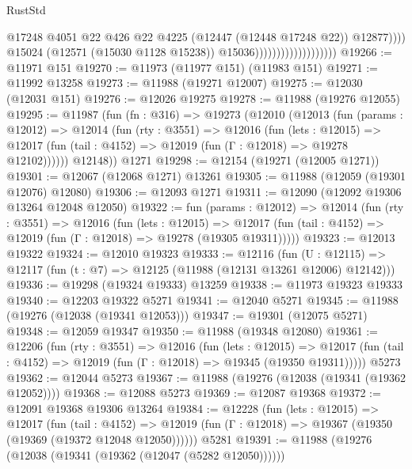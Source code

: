 \begin{lexlean}{RustStd}
\begin{coremodule}
                                                  @17248
                                                  @4051
                                                  @22
                                                  @426
                                                  @22
                                                  @4225
                                                  (@12447 (@12448 @17248 @22))
                                                  @12877))))
                                          @15024
                                          (@12571 (@15030 @1128 @15238))
                                          @15036)))))))))))))))))))
@19266 := @11971 @151
@19270 := @11973 (@11977 @151) (@11983 @151)
@19271 := @11992 @13258
@19273 := @11988 (@19271 @12007)
@19275 := @12030 (@12031 @151)
@19276 := @12026 @19275
@19278 := @11988 (@19276 @12055)
@19295 := @11987
    (fun (fn : @316) =>
    @19273
      (@12010
        (@12013
          (fun (params : @12012) =>
          @12014
            (fun (rty : @3551) =>
            @12016
              (fun (lets : @12015) =>
              @12017 (fun (tail : @4152) => @12019 (fun (Γ : @12018) => @19278 @12102))))))
        @12148))
    @1271
@19298 := @12154 (@19271 (@12005 @1271))
@19301 := @12067 (@12068 @1271) @13261
@19305 := @11988 (@12059 (@19301 @12076) @12080)
@19306 := @12093 @1271
@19311 := @12090 (@12092 @19306 @13264 @12048 @12050)
@19322 := fun (params : @12012) =>
  @12014
    (fun (rty : @3551) =>
    @12016
      (fun (lets : @12015) =>
      @12017 (fun (tail : @4152) => @12019 (fun (Γ : @12018) => @19278 (@19305 @19311)))))
@19323 := @12013 @19322
@19324 := @12010 @19323
@19333 := @12116
    (fun (U : @12115) => @12117 (fun (t : @7) => @12125 (@11988 (@12131 @13261 @12006) @12142)))
@19336 := @19298 (@19324 @19333) @13259
@19338 := @11973 @19323 @19333
@19340 := @12203 @19322 @5271
@19341 := @12040 @5271
@19345 := @11988 (@19276 (@12038 (@19341 @12053)))
@19347 := @19301 (@12075 @5271)
@19348 := @12059 @19347
@19350 := @11988 (@19348 @12080)
@19361 := @12206
    (fun (rty : @3551) =>
    @12016
      (fun (lets : @12015) =>
      @12017 (fun (tail : @4152) => @12019 (fun (Γ : @12018) => @19345 (@19350 @19311)))))
    @5273
@19362 := @12044 @5273
@19367 := @11988 (@19276 (@12038 (@19341 (@19362 @12052))))
@19368 := @12088 @5273
@19369 := @12087 @19368
@19372 := @12091 @19368 @19306 @13264
@19384 := @12228
    (fun (lets : @12015) =>
    @12017
      (fun (tail : @4152) =>
      @12019 (fun (Γ : @12018) => @19367 (@19350 (@19369 (@19372 @12048 @12050))))))
    @5281
@19391 := @11988 (@19276 (@12038 (@19341 (@19362 (@12047 (@5282 @12050))))))

\end{coremodule}
\end{lexlean}
